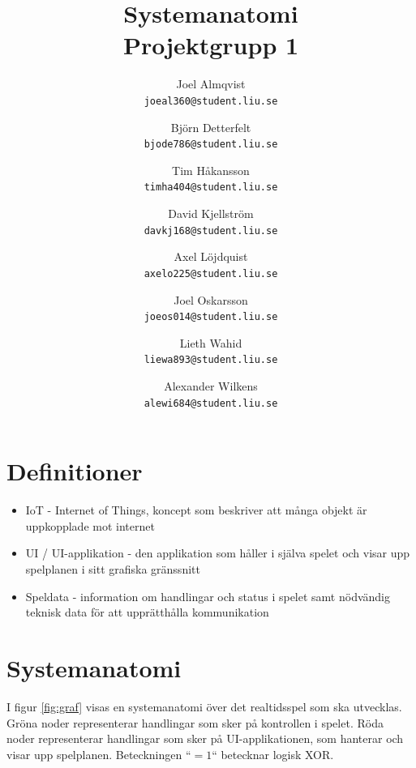 \documentclass[10pt]{article}
\title{Systemanatomi\\
    \large Projektgrupp 1}
\author{
    Joel Almqvist\\
    \texttt{joeal360@student.liu.se}
    \and
    Björn Detterfelt\\
    \texttt{bjode786@student.liu.se}
    \and
    Tim Håkansson\\
    \texttt{timha404@student.liu.se}
    \and
    David Kjellström\\
    \texttt{davkj168@student.liu.se}
    \and
    Axel Löjdquist\\
    \texttt{axelo225@student.liu.se}
    \and
    Joel Oskarsson\\
    \texttt{joeos014@student.liu.se}
    \and
    Lieth Wahid\\
    \texttt{liewa893@student.liu.se}
    \and
    Alexander Wilkens\\
    \texttt{alewi684@student.liu.se}
}
\begin{document}
	\maketitle
	
	\tableofcontents

	\pagebreak
	
	\section{Definitioner}
	\begin{itemize}
		\item IoT - Internet of Things, koncept som beskriver att många objekt är uppkopplade mot internet
		\item UI / UI-applikation - den applikation som håller i själva spelet och visar upp spelplanen i sitt grafiska gränssnitt
		\item Speldata - information om handlingar och status i spelet samt nödvändig teknisk data för att upprätthålla kommunikation
	\end{itemize}
	
	\section{Systemanatomi}	
		I figur \ref{fig:graf} visas en systemanatomi över det realtidsspel som ska utvecklas. Gröna noder representerar handlingar som sker på kontrollen i spelet. Röda noder representerar handlingar som sker på UI-applikationen, som hanterar och visar upp spelplanen. Beteckningen ``$= 1$`` betecknar logisk XOR.\\
	
\end{document}
